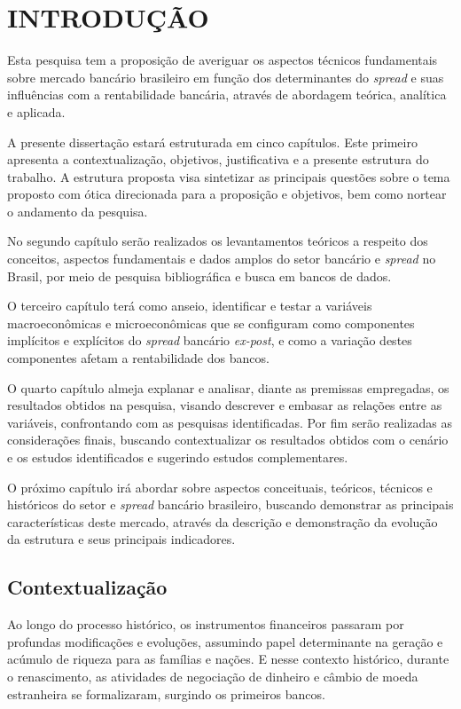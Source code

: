 \documentclass[
  12pt,
  12pt,
  openright,
  oneside,
  a4paper,
  chapter=TITLE,
  section=TITLE,
  subsection=TITLE,
  subsubsection=TITLE,
  english,
  portugues,
  sumario=tradicional]{abntex2}
\begin{document}
\chapter[INTRODUÇÃO]{INTRODUÇÃO}

Esta pesquisa tem a proposição de averiguar os aspectos técnicos fundamentais sobre mercado bancário brasileiro em função dos determinantes do \emph{spread} e suas influências com a rentabilidade bancária, através de abordagem teórica, analítica e aplicada.

A presente dissertação estará estruturada em cinco capítulos. Este primeiro apresenta a contextualização, objetivos, justificativa e a presente estrutura do trabalho. A estrutura proposta visa sintetizar as principais questões sobre o tema proposto com ótica direcionada para a proposição e objetivos, bem como nortear o andamento da pesquisa.

No segundo capítulo serão realizados os levantamentos teóricos a respeito dos conceitos, aspectos fundamentais e dados amplos do setor bancário e \emph{spread} no Brasil, por meio de pesquisa bibliográfica e busca em bancos de dados.

O terceiro capítulo terá como anseio, identificar e testar a variáveis macroeconômicas e microeconômicas que se configuram como componentes implícitos e explícitos do \emph{spread} bancário \emph{ex-post}, e como a variação destes componentes afetam a rentabilidade dos bancos.

O quarto capítulo almeja explanar e analisar, diante as premissas empregadas, os resultados obtidos na pesquisa, visando descrever e embasar as relações entre as variáveis, confrontando com as pesquisas identificadas. Por fim serão realizadas as considerações finais, buscando contextualizar os resultados obtidos com o cenário e os estudos identificados e sugerindo estudos complementares.

O próximo capítulo irá abordar sobre aspectos conceituais, teóricos, técnicos e históricos do setor e \emph{spread} bancário brasileiro, buscando demonstrar as principais características deste mercado, através da descrição e demonstração da evolução da estrutura e seus principais indicadores.

\section{Contextualização}

Ao longo do processo histórico, os instrumentos financeiros passaram por profundas modificações e evoluções, assumindo papel determinante na geração e acúmulo de riqueza para as famílias e nações. E nesse contexto histórico, durante o renascimento, as atividades de negociação de dinheiro e câmbio de moeda estranheira se formalizaram, surgindo os primeiros bancos.
\end{document}
